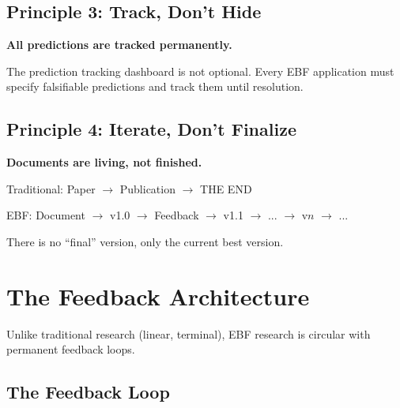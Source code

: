\subsection{Principle 3: Track, Don't Hide}

\begin{tcolorbox}[colback=blue!5!white, colframe=blue!75!black]
\textbf{All predictions are tracked permanently.}

The prediction tracking dashboard is not optional. Every EBF application
must specify falsifiable predictions and track them until resolution.
\end{tcolorbox}

\subsection{Principle 4: Iterate, Don't Finalize}

\begin{tcolorbox}[colback=blue!5!white, colframe=blue!75!black]
\textbf{Documents are living, not finished.}

Traditional: Paper $\to$ Publication $\to$ THE END

EBF: Document $\to$ v1.0 $\to$ Feedback $\to$ v1.1 $\to$ ... $\to$ v$n$ $\to$ ...

There is no ``final'' version, only the current best version.
\end{tcolorbox}



\section{The Feedback Architecture}
\label{sec:apply-feedback}

Unlike traditional research (linear, terminal), EBF research is circular
with permanent feedback loops.

\subsection{The Feedback Loop}

